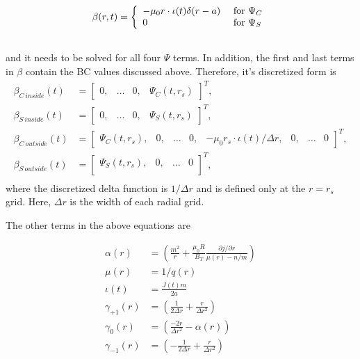 \documentclass{article}
\begin{document}
\begin{equation} \label{eq:beta}
\begin{split}
\beta(r,t) &= \left\{
\begin{array}{l l}
- \mu_0r \cdot \iota(t) \delta (r-a) & \text{ for } \Psi_C \\
0 & \text{ for } \Psi_S\\
\end{array} \right. \\\
\end{split}
\end{equation} 
and it needs to be solved for all four $\Psi$ terms.  In addition, the first and last terms in $\beta$ contain the BC values discussed above.  Therefore, it's discretized form is
\begin{equation} \label{eq:BVPAMatrix}
\begin{split}
\beta_{C \ inside}(t) &= 
\begin{bmatrix}
0,& \ldots &  0, & \Psi_{C}(t,r_s)
\end{bmatrix}^T, \\
\beta_{S \ inside}(t) &= 
\begin{bmatrix}
0,& \ldots &  0, & \Psi_{S}(t,r_s)
\end{bmatrix}^T, \\
\beta_{C \ outside}(t) &= 
\begin{bmatrix}
\Psi_{C}(t,r_s), & 0, & \ldots &0, &-\mu_0r_s \cdot \iota(t)/\Delta r,  &0,&\ldots &  0 
\end{bmatrix}^T, \\
\beta_{S \ outside}(t) &= 
\begin{bmatrix}
\Psi_{S}(t,r_s), & 0, & \ldots &  0 \\
\end{bmatrix}^T, \\
\end{split}
\end{equation}
where the discretized delta function is $1/ \Delta r$ and is defined only at the $r=r_s$ grid.  Here, $\Delta r$ is the width of each radial grid.


The other terms in the above equations are

\begin{equation} \label{eq:BVPTerms}
\begin{split}
\alpha(r)&=\left( \frac{m^2}{r} +\frac{\mu_0 R}{B_T} \frac{\partial j / \partial r}{\mu(r)-n/m} \right) \\
\mu(r)&=1/q(r)\\
\iota(t) &= \frac{J(t)m}{2a} \\
  \gamma_{+1}(r) &=\left(\frac{1}{2 \Delta r}+\frac{r}{\Delta r^2 }\right) \\
  \gamma_{0}(r)& = \left( \frac{-2r}{\Delta r^2} -\alpha(r) \right)\\
  \gamma_{-1}(r)& = \left(-\frac{1}{2\Delta r} + \frac{r}{\Delta r^2} \right)
\end{split}
\end{equation}
\end{document}
